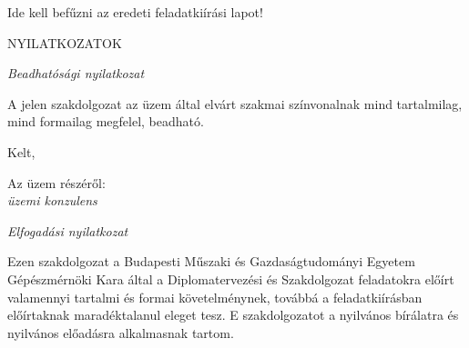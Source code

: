 \iffalse

\newpage\null\thispagestyle{empty}
\newpage\thispagestyle{empty}
Szerzői jog \textcopyright ~Knyihár Gábor, 2018.\\[2cm]

\begin{center}
    \bf ZÁRADÉK
\end{center}


{\bf Ez a szakdolgozat elzártan kezelendő és őrzendő, a hozzáférése a vonatkozó szabályok szerint korlátozott, a dolgozat tartalmát csak az arra feljogosí-tott személyek ismerhetik.}

{\bf A korlátozott hozzáférés időtartamának lejártáig az arra feljogosítottakon kívül csak a korlátozást kérelmező személy vagy gazdálkodó szervezet írásos engedélyéjével rendelkező személy nyerhet betekintést a dolgozat tartalmába.}\\[0.5cm]

{\bf A hozzáférés korlátozása és a zárt kezelés 2023. év december hónap 
31. napján ér véget.}

\fi

\newpage\null\thispagestyle{empty}
\centerline{Ide kell befűzni az eredeti feladatkiírási lapot!}

%

\newpage\thispagestyle{plain}
\begin{center}
    \Large \MakeUppercase{Nyilatkozatok}
\end{center}

{\centering \itshape Beadhatósági nyilatkozat \par}
A jelen szakdolgozat az üzem által elvárt szakmai színvonalnak mind tartalmilag, mind formailag megfelel, beadható.

Kelt, 

{\hspace{0.4\textwidth} Az üzem részéről:}\\[1cm]

{\hspace{0.6\textwidth} \itshape üzemi konzulens}\\[0.1cm]

{\centering \itshape Elfogadási nyilatkozat \par}
Ezen szakdolgozat a Budapesti Műszaki és Gazdaságtudományi Egyetem Gépészmérnöki Kara által a Diplomatervezési és Szakdolgozat feladatokra előírt valamennyi tartalmi és formai követelménynek, továbbá a feladatkiírásban előírtaknak maradéktalanul eleget tesz. E szakdolgozatot a nyilvános bírálatra és nyilvános előadásra alkalmasnak tartom. 

